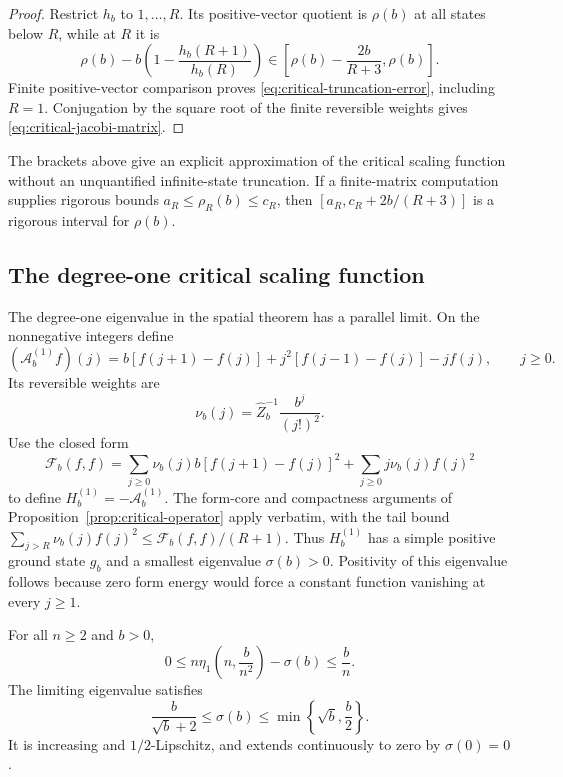 \begin{proof}
Restrict $h_b$ to $1,\ldots,R$.  Its positive-vector quotient is
$\rho(b)$ at all states below $R$, while at $R$ it is
\[
 \rho(b)-b\left(1-\frac{h_b(R+1)}{h_b(R)}\right)
 \in\left[\rho(b)-\frac{2b}{R+3},\rho(b)\right].
\]
Finite positive-vector comparison proves
\eqref{eq:critical-truncation-error}, including $R=1$.  Conjugation by
the square root of the finite reversible weights gives
\eqref{eq:critical-jacobi-matrix}.
\end{proof}

The brackets above give an explicit approximation of the critical
scaling function without an unquantified infinite-state truncation.
If a finite-matrix computation supplies rigorous bounds
$a_R\leq\rho_R(b)\leq c_R$, then
$[a_R,c_R+2b/(R+3)]$ is a rigorous interval for $\rho(b)$.

\subsection{The degree-one critical scaling function}

The degree-one eigenvalue in the spatial theorem has a parallel
limit.  On the nonnegative integers define
\begin{equation}\label{eq:critical-degree-one-operator}
 (\mathcal A_b^{(1)}f)(j)
 =b[f(j+1)-f(j)]+j^2[f(j-1)-f(j)]-jf(j),
 \qquad j\geq0.
\end{equation}
Its reversible weights are
\[
 \nu_b(j)=\widehat Z_b^{-1}\frac{b^j}{(j!)^2}.
\]
Use the closed form
\[
 \mathcal F_b(f,f)
 =\sum_{j\geq0}\nu_b(j)b[f(j+1)-f(j)]^2
   +\sum_{j\geq0}j\nu_b(j)f(j)^2
\]
to define $H_b^{(1)}=-\mathcal A_b^{(1)}$.  The form-core and
compactness arguments of Proposition~\ref{prop:critical-operator}
apply verbatim, with the tail bound
$\sum_{j>R}\nu_b(j)f(j)^2\leq\mathcal F_b(f,f)/(R+1)$.
Thus $H_b^{(1)}$ has a simple positive ground state $g_b$ and a
smallest eigenvalue $\sigma(b)>0$.  Positivity of this eigenvalue
follows because zero form energy would force a constant function
vanishing at every $j\geq1$.

\begin{proposition}
\label{prop:critical-degree-one}
For all $n\geq2$ and $b>0$,
\begin{equation}\label{eq:critical-degree-one-error}
 0\leq n\eta_1\left(n,\frac b{n^2}\right)-\sigma(b)
 \leq\frac bn.
\end{equation}
The limiting eigenvalue satisfies
\begin{equation}\label{eq:critical-degree-one-bounds}
 \frac{b}{\sqrt b+2}\leq\sigma(b)
 \leq\min\left\{\sqrt b,\frac b2\right\}.
\end{equation}
It is increasing and $1/2$-Lipschitz, and extends continuously to zero
by $\sigma(0)=0$.
\end{proposition}

